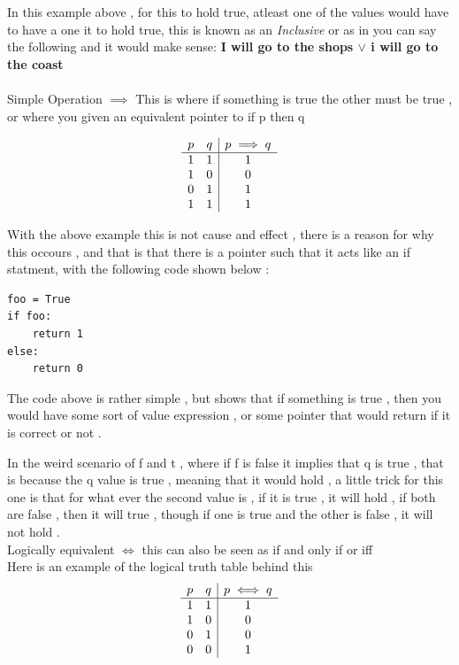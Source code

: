 \documentclass{article}
\theoremstyle{mytheoremstyle}
\theoremstyle{mytheoremstyle}
\theoremstyle{myproblemstyle}
\begin{document}
In this example above , for this to hold true, atleast one of the values would have to have a one it to hold true, this is known as an \textit{Inclusive} or as in you can say the following and it would make sense:
\textbf{I will go to the shops $\lor$ i will go to the coast}\\

\\

Simple Operation $\implies$
This is where if something is true the other must be true , or where you given an equivalent pointer to if p then q


\[\begin{array}{ c c | c }
		p & q & p \implies q \\
		\hline
		1 & 1 & 1            \\
		1 & 0 & 0            \\
		0 & 1 & 1            \\
		1 & 1 & 1            \\
	\end{array}\]


With the above example this is not cause and effect , there is a reason for why this occours , and that is that there is a pointer such that it acts like an if statment, with the following code shown below :

\begin{lstlisting}
foo = True
if foo:
    return 1
else:
    return 0
\end{lstlisting}

The code above is rather simple , but shows that if something is true , then you would have some sort of value expression , or some pointer that would return if it is correct or not .

In the weird scenario of f and t , where if f is false it implies that q is true , that is because  the q value is true , meaning that it would hold , a little trick for this one is that for what ever the second value is , if it is true , it will hold , if both are false , then it will true , though if one is true and the other is false , it will not hold .\\

Logically equivalent $\iff$ this can also be seen as if and only if or iff \\
Here is an example of the logical truth table behind this
\[\begin{array}{c c | c }
		p & q & p \iff q \\
		\hline
		1 & 1 & 1        \\
		1 & 0 & 0        \\
		0 & 1 & 0        \\
		0 & 0 & 1        \\
	\end{array}\]
\end{document}

